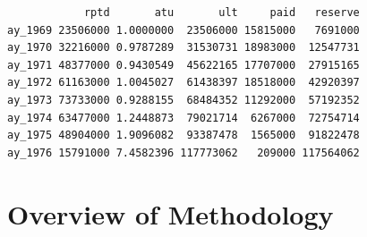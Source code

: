 \documentclass[
  letterpaper,
  DIV=11,
  numbers=noendperiod]{scrartcl}
\newenvironment{Shaded}{\begin{snugshade}}{\end{snugshade}}
\newcommand{\AttributeTok}[1]{\textcolor[rgb]{0.40,0.45,0.13}{#1}}
\newcommand{\CommentTok}[1]{\textcolor[rgb]{0.37,0.37,0.37}{#1}}
\newcommand{\DecValTok}[1]{\textcolor[rgb]{0.68,0.00,0.00}{#1}}
\newcommand{\FunctionTok}[1]{\textcolor[rgb]{0.28,0.35,0.67}{#1}}
\newcommand{\NormalTok}[1]{\textcolor[rgb]{0.00,0.23,0.31}{#1}}
\newcommand{\OtherTok}[1]{\textcolor[rgb]{0.00,0.23,0.31}{#1}}
\newcommand{\SpecialCharTok}[1]{\textcolor[rgb]{0.37,0.37,0.37}{#1}}
\newcommand{\StringTok}[1]{\textcolor[rgb]{0.13,0.47,0.30}{#1}}
\begin{document}
\begin{Shaded}
\end{Shaded}

\begin{verbatim}
            rptd       atu       ult     paid   reserve
ay_1969 23506000 1.0000000  23506000 15815000   7691000
ay_1970 32216000 0.9787289  31530731 18983000  12547731
ay_1971 48377000 0.9430549  45622165 17707000  27915165
ay_1972 61163000 1.0045027  61438397 18518000  42920397
ay_1973 73733000 0.9288155  68484352 11292000  57192352
ay_1974 63477000 1.2448873  79021714  6267000  72754714
ay_1975 48904000 1.9096082  93387478  1565000  91822478
ay_1976 15791000 7.4582396 117773062   209000 117564062
\end{verbatim}

\section{Overview of Methodology}\label{overview-of-methodology}
\end{document}
